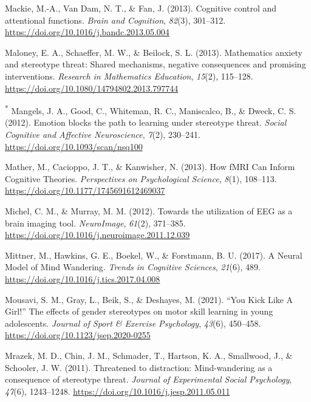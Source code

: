 \documentclass[
  stu, a4paper,floatsintext]{apa7}
\newlength{\cslhangindent}
\newenvironment{CSLReferences}[2] %
 {\begin{list}{}{%
  \setlength{\itemindent}{0pt}
  \setlength{\leftmargin}{0pt}
  \setlength{\parsep}{0pt}
  \ifodd #1
   \setlength{\leftmargin}{\cslhangindent}
   \setlength{\itemindent}{-1\cslhangindent}
  \fi
  \setlength{\itemsep}{#2\baselineskip}}}
 {\end{list}}
\begin{document}
\begin{CSLReferences}{1}{0}
Mackie, M.-A., Van Dam, N. T., \& Fan, J. (2013). Cognitive control and attentional functions. \emph{Brain and Cognition}, \emph{82}(3), 301--312. \url{https://doi.org/10.1016/j.bandc.2013.05.004}

Maloney, E. A., Schaeffer, M. W., \& Beilock, S. L. (2013). Mathematics anxiety and stereotype threat: Shared mechanisms, negative consequences and promising interventions. \emph{Research in Mathematics Education}, \emph{15}(2), 115--128. \url{https://doi.org/10.1080/14794802.2013.797744}

\textsuperscript{*} Mangels, J. A., Good, C., Whiteman, R. C., Maniscalco, B., \& Dweck, C. S. (2012). Emotion blocks the path to learning under stereotype threat. \emph{Social Cognitive and Affective Neuroscience}, \emph{7}(2), 230--241. \url{https://doi.org/10.1093/scan/nsq100}

Mather, M., Cacioppo, J. T., \& Kanwisher, N. (2013). How {fMRI Can Inform Cognitive Theories}. \emph{Perspectives on Psychological Science}, \emph{8}(1), 108--113. \url{https://doi.org/10.1177/1745691612469037}

Michel, C. M., \& Murray, M. M. (2012). Towards the utilization of {EEG} as a brain imaging tool. \emph{NeuroImage}, \emph{61}(2), 371--385. \url{https://doi.org/10.1016/j.neuroimage.2011.12.039}

Mittner, M., Hawkins, G. E., Boekel, W., \& Forstmann, B. U. (2017). A {Neural Model} of {Mind Wandering}. \emph{Trends in Cognitive Sciences}, \emph{21}(6), 489. \url{https://doi.org/10.1016/j.tics.2017.04.008}

Mousavi, S. M., Gray, L., Beik, S., \& Deshayes, M. (2021). {``{You Kick Like A Girl}!''} The effects of gender stereotypes on motor skill learning in young adolescents. \emph{Journal of Sport \& Exercise Psychology}, \emph{43}(6), 450--458. \url{https://doi.org/10.1123/jsep.2020-0255}

Mrazek, M. D., Chin, J. M., Schmader, T., Hartson, K. A., Smallwood, J., \& Schooler, J. W. (2011). Threatened to distraction: {Mind-wandering} as a consequence of stereotype threat. \emph{Journal of Experimental Social Psychology}, \emph{47}(6), 1243--1248. \url{https://doi.org/10.1016/j.jesp.2011.05.011}


\end{CSLReferences}
\end{document}

